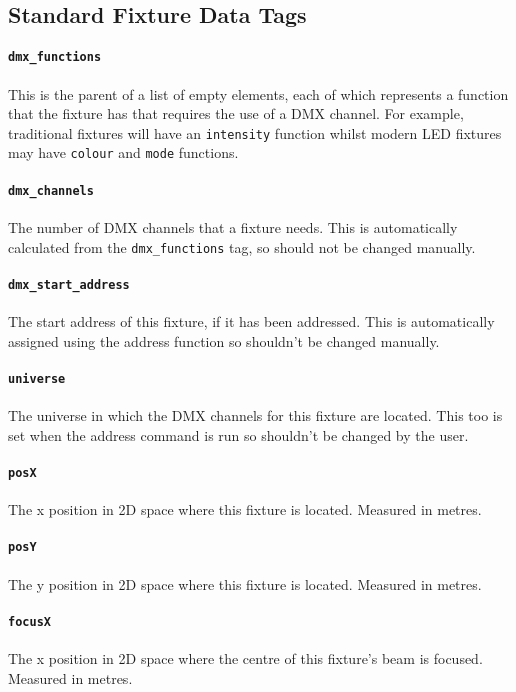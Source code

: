 \documentclass[a4paper]{article}
\begin{document}
\subsection{Standard Fixture Data Tags} \label{sec:fixtags}

\paragraph{\texttt{dmx\_functions}}
This is the parent of a list of empty elements, each of which represents a 
function that the fixture has that requires the use of a DMX channel. For 
example, traditional fixtures will have an \texttt{intensity} function 
whilst modern LED fixtures may have \texttt{colour} and \texttt{mode} 
functions.

\paragraph{\texttt{dmx\_channels}}
The number of DMX channels that a fixture needs. This is automatically 
calculated from the \texttt{dmx\_functions} tag, so should not be changed 
manually.

\paragraph{\texttt{dmx\_start\_address}}
The start address of this fixture, if it has been addressed. This is 
automatically assigned using the address function so shouldn't be changed 
manually.

\paragraph{\texttt{universe}}
The universe in which the DMX channels for this fixture are located. This too 
is set when the address command is run so shouldn't be changed by the user. 

\paragraph{\texttt{posX}}
The x position in 2D space where this fixture is located. Measured in metres.

\paragraph{\texttt{posY}}
The y position in 2D space where this fixture is located. Measured in metres.

\paragraph{\texttt{focusX}}
The x position in 2D space where the centre of this fixture's beam is 
focused. Measured in metres.
\end{document}

